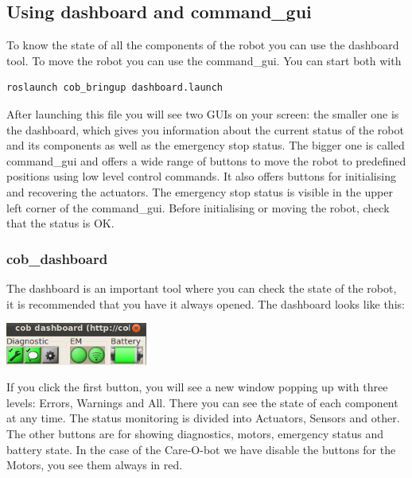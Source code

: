 \subsection{Using dashboard and command\_gui}
To know the state of all the components of the robot you can use the dashboard tool. To move the robot you can use the command\_gui. You can start both with
\begin{lstlisting}
roslaunch cob_bringup dashboard.launch
\end{lstlisting}

After launching this file you will see two GUIs on your screen: the smaller one is the dashboard, which gives you information about the current status of the robot and its components as well as the emergency stop status. The bigger one is called command\_gui and offers a wide range of buttons to move the robot to predefined positions using low level control commands. It also offers buttons for initialising and recovering the actuators. The emergency stop status is visible in the upper left corner of the command\_gui. Before initialising or moving the robot, check that the status is OK.

\subsubsection{cob\_dashboard}\label{subsec:dashboard}
The dashboard is an important tool where you can check the state of the robot, it is recommended that you have it always opened. The dashboard looks like this:

\begin{center}
\includegraphics[width=0.35\textwidth]{images/dashboard.png}
\end{center}
If you click the first button, you will see a new window popping up with three levels: Errors, Warnings and All. There you can see the state of each component at any time. The status monitoring is divided into Actuators, Sensors and other. The other buttons are for showing diagnostics, motors, emergency status and battery state. In the case of the Care-O-bot we have disable the buttons for the Motors, you see them always in red.

